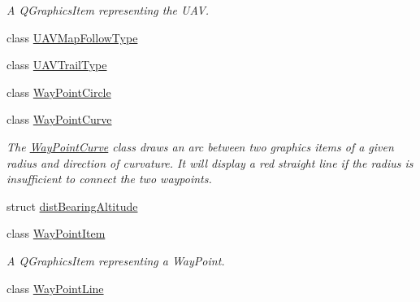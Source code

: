 \begin{DoxyCompactItemize}
\begin{DoxyCompactList}\small\item\em A Q\-Graphics\-Item representing the U\-A\-V. \end{DoxyCompactList}\item 
class \hyperlink{classmapcontrol_1_1_u_a_v_map_follow_type}{U\-A\-V\-Map\-Follow\-Type}
\item 
class \hyperlink{classmapcontrol_1_1_u_a_v_trail_type}{U\-A\-V\-Trail\-Type}
\item 
class \hyperlink{classmapcontrol_1_1_way_point_circle}{Way\-Point\-Circle}
\item 
class \hyperlink{classmapcontrol_1_1_way_point_curve}{Way\-Point\-Curve}
\begin{DoxyCompactList}\small\item\em The \hyperlink{classmapcontrol_1_1_way_point_curve}{Way\-Point\-Curve} class draws an arc between two graphics items of a given radius and direction of curvature. It will display a red straight line if the radius is insufficient to connect the two waypoints. \end{DoxyCompactList}\item 
struct \hyperlink{structmapcontrol_1_1dist_bearing_altitude}{dist\-Bearing\-Altitude}
\item 
class \hyperlink{classmapcontrol_1_1_way_point_item}{Way\-Point\-Item}
\begin{DoxyCompactList}\small\item\em A Q\-Graphics\-Item representing a Way\-Point. \end{DoxyCompactList}\item 
class \hyperlink{classmapcontrol_1_1_way_point_line}{Way\-Point\-Line}
\end{DoxyCompactItemize}
